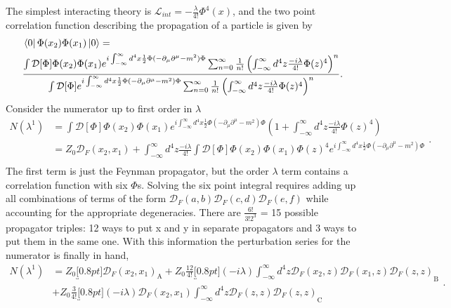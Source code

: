 The simplest interacting theory is $\mathcal{L}_{int} = -\frac{\lambda}{4!}\Phi^4(x)$, and the two point correlation function describing the propagation of a particle is given by
\begin{equation}
\begin{split}
&\bra{0}\Phi(x_2)\Phi(x_1)\ket{0} = \\ 
& \frac{\int \mathcal{D}[\Phi]\Phi(x_2)\Phi(x_1)
e^{i\int_{-\infty}^{\infty} d^4x \frac{1}{2}\Phi (-\partial_\mu\partial^\mu - m^2)\Phi} \sum_{n=0}^{\infty} \frac{1}{n!}\left(\int_{-\infty}^{\infty} d^4z \frac{-i\lambda}{4!}\Phi(z)^4\right)^n}
{\int \mathcal{D}[\Phi]e^{i\int_{-\infty}^{\infty} d^4x \frac{1}{2}\Phi (-\partial_\mu\partial^\mu - m^2)\Phi} \sum_{n=0}^{\infty} \frac{1}{n!}\left(\int_{-\infty}^{\infty} d^4z \frac{-i\lambda}{4!}\Phi(z)^4 \right)^n }. \\
\end{split}
\end{equation}
Consider the numerator up to first order in $\lambda$
\begin{equation}
\begin{split}
N(\lambda^1) &= \int \mathcal{D}[\Phi]\Phi(x_2)\Phi(x_1)
e^{i\int_{-\infty}^{\infty} d^4x \frac{1}{2}\Phi (-\partial_\mu\partial^\mu - m^2)\Phi} \left(1 + \int_{-\infty}^{\infty} d^4z \frac{-i\lambda}{4!}\Phi(z)^4\right) \\
&=  Z_0\mathcal{D}_F(x_2,x_1) +  
\int_{-\infty}^{\infty} d^4z \frac{-i\lambda}{4!} \int \mathcal{D}[\Phi]\Phi(x_2)\Phi(x_1)\Phi(z)^4e^{i\int_{-\infty}^{\infty} d^4x \frac{1}{2}\Phi (-\partial_\mu\partial^\mu - m^2)\Phi}\\
\end{split}.
\end{equation}
The first term is just the Feynman propagator, but the order $\lambda$ term contains a correlation function with six $\Phi$s. Solving the six point integral requires adding up all combinations of terms of the form $\mathcal{D}_F(a,b) \mathcal{D}_F(c,d) \mathcal{D}_F(e,f)$ while accounting for the appropriate degeneracies. There are $\frac{6!}{3!2^3}$ = 15 possible propagator triples: 12 ways to put x and y in separate propagators and 3 ways to put them in the same one. With this information the perturbation series for the numerator is finally in hand, 
\begin{equation}
\begin{split}
N(\lambda^1) &= Z_0\underbracket[0.8pt]{\mathcal{D}_F(x_2,x_1)}_\text{A} 
+ Z_0\frac{12}{4!} \underbracket[0.8pt]{(-i\lambda)\int_{-\infty}^{\infty} d^4z \mathcal{D}_F(x_2,z) \mathcal{D}_F(x_1,z) \mathcal{D}_F(z,z)}_\text{B} \\ 
&+ Z_0\frac{3}{4!}\underbracket[0.8pt]{(-i\lambda)\mathcal{D}_F(x_2,x_1) \int_{-\infty}^{\infty} d^4z \mathcal{D}_F(z,z) \mathcal{D}_F(z,z)}_\text{C} 
\end{split}.
\end{equation} 

